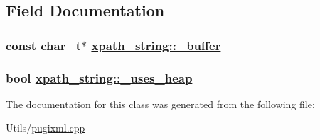 \subsection{Field Documentation}
\hypertarget{classxpath__string_d52a80412797ca64bbd1bff527e9d666}{
\subsubsection[\_\-buffer]{\setlength{\rightskip}{0pt plus 5cm}const char\_\-t$\ast$ \hyperlink{classxpath__string_d52a80412797ca64bbd1bff527e9d666}{xpath\_\-string::\_\-buffer}}}
\label{classxpath__string_d52a80412797ca64bbd1bff527e9d666}


\hypertarget{classxpath__string_67a86f6d1a9cf20b922fc9fb1268d4c1}{
\subsubsection[\_\-uses\_\-heap]{\setlength{\rightskip}{0pt plus 5cm}bool \hyperlink{classxpath__string_67a86f6d1a9cf20b922fc9fb1268d4c1}{xpath\_\-string::\_\-uses\_\-heap}}}
\label{classxpath__string_67a86f6d1a9cf20b922fc9fb1268d4c1}




The documentation for this class was generated from the following file:\begin{CompactItemize}
\item 
Utils/\hyperlink{pugixml_8cpp}{pugixml.cpp}\end{CompactItemize}
